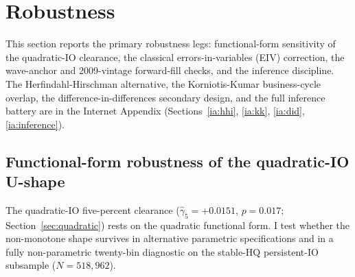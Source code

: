 \section{Robustness}
\label{sec:robustness}

This section reports the primary robustness legs: functional-form sensitivity of the quadratic-IO clearance, the classical errors-in-variables (EIV) correction, the wave-anchor and 2009-vintage forward-fill checks, and the inference discipline. The Herfindahl-Hirschman alternative, the Korniotis-Kumar business-cycle overlap, the difference-in-differences secondary design, and the full inference battery are in the Internet Appendix (Sections~\ref{ia:hhi}, \ref{ia:kk}, \ref{ia:did}, \ref{ia:inference}).

\subsection{Functional-form robustness of the quadratic-IO U-shape}
\label{sec:robust-form}

The quadratic-IO five-percent clearance ($\hat\gamma_{5} = +0.0151$, $p = 0.017$; Section~\ref{sec:quadratic}) rests on the quadratic functional form. I test whether the non-monotone shape survives in alternative parametric specifications and in a fully non-parametric twenty-bin diagnostic on the stable-HQ persistent-IO subsample ($N = 518{,}962$).

